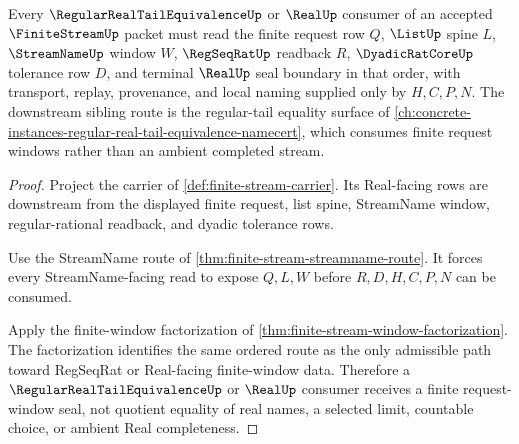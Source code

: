 \begin{theorem}
\label{thm:finite-stream-real-seal-forward-link}
Every $\RegularRealTailEquivalenceUp$ or $\RealUp$ consumer of an accepted $\FiniteStreamUp$ packet must read the finite request row $Q$, $\ListUp$ spine $L$, $\StreamNameUp$ window $W$, $\RegSeqRatUp$ readback $R$, $\DyadicRatCoreUp$ tolerance row $D$, and terminal $\RealUp$ seal boundary in that order, with transport, replay, provenance, and local naming supplied only by $H,C,P,N$. The downstream sibling route is the regular-tail equality surface of \autoref{ch:concrete-instances-regular-real-tail-equivalence-namecert}, which consumes finite request windows rather than an ambient completed stream.
\end{theorem}
\begin{proof}
Project the carrier of \autoref{def:finite-stream-carrier}. Its Real-facing rows are downstream from the displayed finite request, list spine, StreamName window, regular-rational readback, and dyadic tolerance rows.

Use the StreamName route of \autoref{thm:finite-stream-streamname-route}. It forces every StreamName-facing read to expose $Q,L,W$ before $R,D,H,C,P,N$ can be consumed.

Apply the finite-window factorization of \autoref{thm:finite-stream-window-factorization}. The factorization identifies the same ordered route as the only admissible path toward RegSeqRat or Real-facing finite-window data. Therefore a $\RegularRealTailEquivalenceUp$ or $\RealUp$ consumer receives a finite request-window seal, not quotient equality of real names, a selected limit, countable choice, or ambient Real completeness.
\end{proof}

